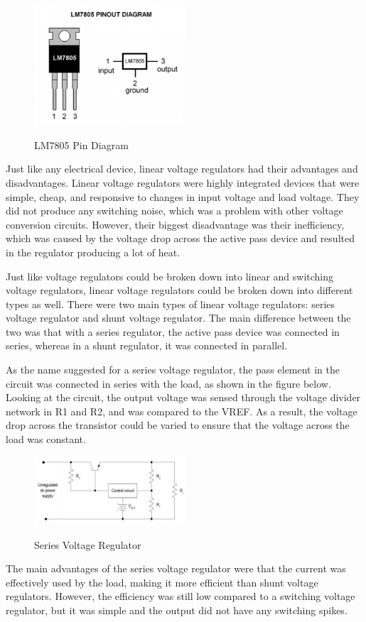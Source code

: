 \begin{figure}[H]
    \caption{LM7805 Pin Diagram}
    \centering
    \includegraphics[width=0.5\textwidth]{images/LM7805_pin_diagram.png}
    \label{fig:LM7805-pin-diagram}
\end{figure}
Just like any electrical device, linear voltage regulators had their advantages and disadvantages. Linear voltage regulators were highly integrated devices that were simple, cheap, and responsive to changes in input voltage and load voltage. They did not produce any switching noise, which was a problem with other voltage conversion circuits. However, their biggest disadvantage was their inefficiency, which was caused by the voltage drop across the active pass device and resulted in the regulator producing a lot of heat.

Just like voltage regulators could be broken down into linear and switching voltage regulators, linear voltage regulators could be broken down into different types as well. There were two main types of linear voltage regulators: series voltage regulator and shunt voltage regulator. The main difference between the two was that with a series regulator, the active pass device was connected in series, whereas in a shunt regulator, it was connected in parallel.

As the name suggested for a series voltage regulator, the pass element in the circuit was connected in series with the load, as shown in the figure below. Looking at the circuit, the output voltage was sensed through the voltage divider network in R1 and R2, and was compared to the VREF. As a result, the voltage drop across the transistor could be varied to ensure that the voltage across the load was constant.
\begin{figure}[H]
    \caption{Series Voltage Regulator}
    \centering
    \includegraphics[width=0.5\textwidth]{images/Series_Voltage_Regulator.png}
    \label{fig:series-voltage-regulator}
\end{figure}
The main advantages of the series voltage regulator were that the current was effectively used by the load, making it more efficient than shunt voltage regulators. However, the efficiency was still low compared to a switching voltage regulator, but it was simple and the output did not have any switching spikes.

